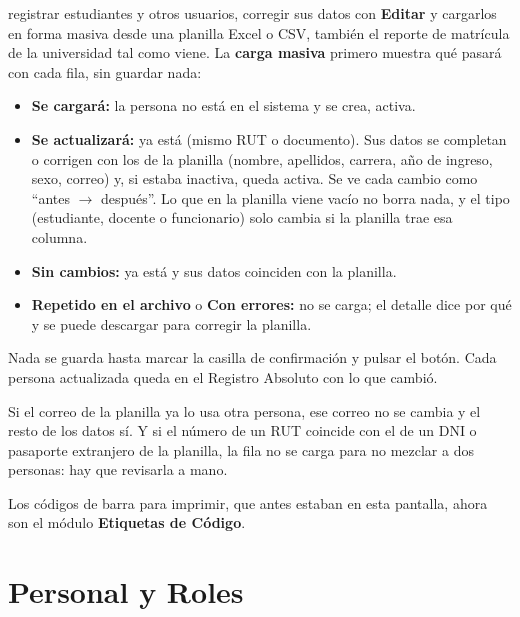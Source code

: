 \documentclass[11pt,a4paper]{report}
\begin{document}
\begin{itemize}
  registrar estudiantes y otros usuarios, corregir sus datos con
  \textbf{Editar} y cargarlos en forma masiva desde una planilla Excel o
  CSV, también el reporte de matrícula de la universidad tal como viene. La
  \textbf{carga masiva} primero muestra qué pasará con cada fila, sin
  guardar nada:
  \begin{itemize}
    \item \textbf{Se cargará:} la persona no está en el sistema y se crea,
    activa.
    \item \textbf{Se actualizará:} ya está (mismo RUT o documento). Sus
    datos se completan o corrigen con los de la planilla (nombre,
    apellidos, carrera, año de ingreso, sexo, correo) y, si estaba
    inactiva, queda activa. Se ve cada cambio como ``antes $\rightarrow$
    después''. Lo que en la planilla viene vacío no borra nada, y el tipo
    (estudiante, docente o funcionario) solo cambia si la planilla trae esa
    columna.
    \item \textbf{Sin cambios:} ya está y sus datos coinciden con la
    planilla.
    \item \textbf{Repetido en el archivo} o \textbf{Con errores:} no se
    carga; el detalle dice por qué y se puede descargar para corregir la
    planilla.
  \end{itemize}
  Nada se guarda hasta marcar la casilla de confirmación y pulsar el botón.
  Cada persona actualizada queda en el Registro Absoluto con lo que cambió.
\end{itemize}

\begin{nota}
Si el correo de la planilla ya lo usa otra persona, ese correo no se
cambia y el resto de los datos sí. Y si el número de un RUT coincide con
el de un DNI o pasaporte extranjero de la planilla, la fila no se carga
para no mezclar a dos personas: hay que revisarla a mano.
\end{nota}


\begin{nota}
Los códigos de barra para imprimir, que antes estaban en esta pantalla,
ahora son el módulo \textbf{Etiquetas de Código}.
\end{nota}

\section{Personal y Roles}
\label{cap:personal-roles}
\end{document}
